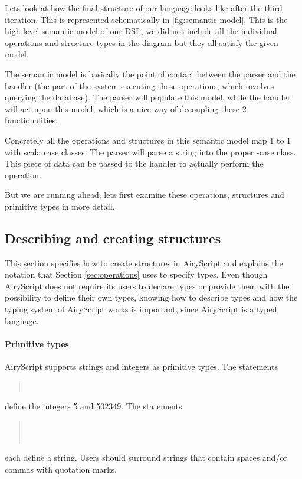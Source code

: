 Lets look at how the final structure of our language looks like after the
third iteration. This is represented schematically in \ref{fig:semantic-model}.
This is the high level semantic model of our DSL, we did not include all the
individual operations and structure types in the diagram but they all satisfy
the given model.

The semantic model is basically the point of contact between the parser and
the handler (the part of the system executing those operations, which involves
querying the database). The parser will populate this model, while the handler
will act upon this model, which is a nice way of decoupling these 2
functionalities.

Concretely all the operations and structures in this semantic model map 1 to 1
with scala case classes. The parser will parse a string into the proper
-case class. This piece of data can be passed to the handler to
actually perform the operation.

But we are running ahead, lets first examine these operations, structures and
primitive types in more detail.


\subsection{Describing and creating structures}
\label{sec:syntax_spec}
This section specifies how to create structures in AiryScript and explains the
notation that Section \ref{sec:operations} uses to specify types. Even though
AiryScript does not require its users to declare types or provide them with
the possibility to define their own types, knowing how to describe types and how
the typing system of AiryScript works is important, since AiryScript is a typed
language.

\paragraph{Primitive types}
AiryScript supports strings and integers as primitive types. The statements
\begin{quote}
  \\
\end{quote}
define the integers 5 and 502349. The statements
\begin{quote}
  \\
  \\
\end{quote}
each define a string. Users should surround strings that contain spaces and/or
commas with quotation marks.


